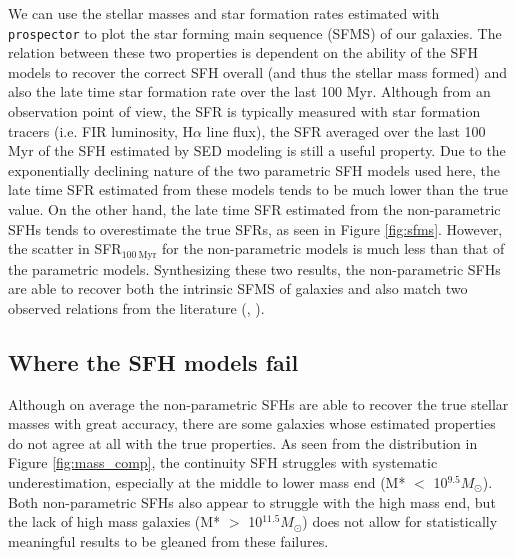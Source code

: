 \documentclass[twocolumn]{aastex62}
\begin{document}
We can use the stellar masses and star formation rates estimated with \texttt{prospector} to plot the star forming main sequence (SFMS) of our galaxies. The relation between these two properties is dependent on the ability of the SFH models to recover the correct SFH overall (and thus the stellar mass formed) and also the late time star formation rate over the last 100 Myr. Although from an observation point of view, the SFR is typically measured with star formation tracers (i.e. FIR luminosity, H$\alpha$ line flux), the SFR averaged over the last 100 Myr of the SFH estimated by SED modeling is still a useful property. Due to the exponentially declining nature of the two parametric SFH models used here, the late time SFR estimated from these models tends to be much lower than the true value. On the other hand, the late time SFR estimated from the non-parametric SFHs tends to overestimate the true SFRs, as seen in Figure \ref{fig:sfms}. However, the scatter in SFR$_{100 \: \mathrm{Myr}}$ for the non-parametric models is much less than that of the parametric models. Synthesizing these two results, the non-parametric SFHs are able to recover both the intrinsic SFMS of galaxies and also match two observed relations from the literature (\cite{boogaard_muse_2018}, \cite{schreiber_herschel_2015}). 

\subsection{Where the SFH models fail}


Although on average the non-parametric SFHs are able to recover the true stellar masses with great accuracy, there are some galaxies whose estimated properties do not agree at all with the true properties. As seen from the distribution in Figure \ref{fig:mass_comp}, the continuity SFH struggles with systematic underestimation, especially at the middle to lower mass end (M* $<$ 10$^{9.5} M_{\odot}$). Both non-parametric SFHs also appear to struggle with the high mass end, but the lack of high mass galaxies (M* $>$ 10$^{11.5} M_{\odot}$) does not allow for statistically meaningful results to be gleaned from these failures. 
\end{document}
